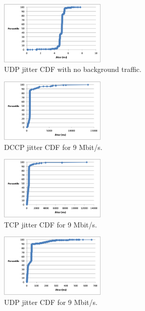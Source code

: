 \begin{figure}[!h]
   \centering
      \includegraphics[width=0.45\textwidth]{pics/udp_none_jitter}
   \caption{UDP jitter CDF with no background traffic.}
\label{fig:udp_none_jitter}
\end{figure}

\begin{figure}[!h]
   \centering
      \includegraphics[width=0.45\textwidth]{pics/dccp_9_jitter}
   \caption{DCCP jitter CDF for 9 Mbit/s.}
\label{fig:dccp_9_jitter}
\end{figure}

\begin{figure}[!h]
   \centering
      \includegraphics[width=0.45\textwidth]{pics/tcp_9_jitter}
   \caption{TCP jitter CDF for 9 Mbit/s.}
\label{fig:tcp_9_jitter}
\end{figure}

\begin{figure}[!h]
   \centering
      \includegraphics[width=0.45\textwidth]{pics/udp_9_jitter}
   \caption{UDP jitter CDF for 9 Mbit/s.}
\label{fig:udp_9_jitter}
\end{figure}

